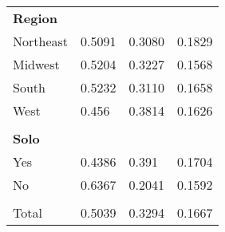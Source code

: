 \documentclass[11pt, oneside]{article}        %
\begin{document}
\begin{table}[h]
\begin{tabular}{llll}
\textbf{Region}                        &        &          &          \\
Northeast                              & 0.5091 & 0.3080    & 0.1829   \\
Midwest                                & 0.5204 & 0.3227   & 0.1568   \\
South                                  & 0.5232 & 0.3110    & 0.1658   \\
West                                   & 0.456  & 0.3814   & 0.1626   \\
                                       &        &          &          \\
\textbf{Solo}                          &        &          &          \\
Yes                                    & 0.4386 & 0.391    & 0.1704   \\
No                                     & 0.6367 & 0.2041   & 0.1592  \\
                                       &        &          &          \\
Total                                  & 0.5039 & 0.3294   & 0.1667   \\
\hline \hline
\end{tabular}
\end{table}
\end{document}
